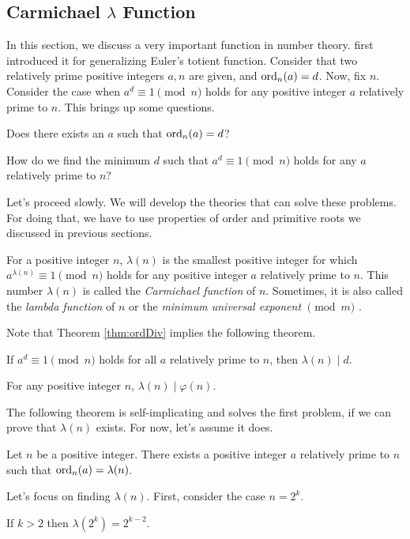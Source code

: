 \subsection{Carmichael \texorpdfstring{$\lambda$}{Lambda} Function}
In this section, we discuss a very important function in number theory. \textcite{carmichael_1910} first introduced it for generalizing Euler's totient function. Consider that two relatively prime positive integers $a,n$ are given, and $\operatorname{ord}_n(a)=d$. Now, fix $n$. Consider the case when $a^d\equiv1\pmod n$ holds for any positive integer $a$ relatively prime to $n$. This brings up some questions.
\begin{problem}\label{prob:CarmichaelQuestion1}
	Does there exists an $a$ such that $\operatorname{ord}_n(a)=d$?
\end{problem}

\begin{problem}\label{prob:CarmichaelQuestion2}
	How do we find the minimum $d$ such that $a^d\equiv1\pmod n$ holds for any $a$ relatively prime to $n$?
\end{problem}
Let's proceed slowly. We will develop the theories that can solve these problems. For doing that, we have to use properties of order and primitive roots we discussed in previous sections.
\begin{definition}
	For a positive integer $n$, $\lambda(n)$ is the smallest positive integer for which $a^{\lambda(n)}\equiv1\pmod n$ holds for any positive integer $a$ relatively prime to $n$. This number $\lambda(n)$ is called the \textit{Carmichael function} of $n$. Sometimes, it is also called the \textit{lambda function} of $n$ or the \textit{minimum universal exponent} $\pmod m$ \textcite[Chapter $\S$VI, Section $4$, Page $265$]{sierpinski_schinzel_1988}.
\end{definition}
Note that Theorem \eqref{thm:ordDiv} implies the following theorem.
\begin{theorem}\label{thm:carDiv}
	If $a^d\equiv1\pmod n$ holds for all $a$ relatively prime to $n$, then $\lambda(n)\mid d$.
\end{theorem}

\begin{corollary}\label{cor:LambdaDividesPhi}
	For any positive integer $n$, $\lambda(n)\mid \varphi(n)$.
\end{corollary}
The following theorem is self-implicating and solves the first problem, if we can prove that $\lambda(n)$ exists. For now, let's assume it does.
\begin{theorem}
	Let $n$ be a positive integer. There exists a positive integer $a$ relatively prime to $n$ such that $\operatorname{ord}_n(a)=\lambda(n)$.
\end{theorem}
Let's focus on finding $\lambda(n)$. First, consider the case $n=2^k$.
\begin{theorem}
	If $k>2$ then $\lambda(2^k)=2^{k-2}$.
\end{theorem}

